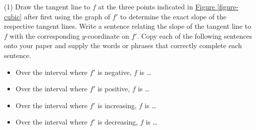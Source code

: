 \documentclass[12pt,]{book}
\theoremstyle{plain}
\theoremstyle{definition}
\numberwithin{equation}{section}
\newcounter{figstack}
\newcounter{figindex}
\newlength\fight
\newcommand\pushValignCaptionBottom[5][b]{%
\stepcounter{figstack}%
\expandafter\def\csname %
figalign\romannumeral\value{figstack}\endcsname{#1}%
\expandafter\def\csname %
figtype\romannumeral\value{figstack}\endcsname{#2}%
\expandafter\def\csname %
figwd\romannumeral\value{figstack}\endcsname{#3}%
\expandafter\def\csname %
figcontent\romannumeral\value{figstack}\endcsname{#4}%
\expandafter\def\csname %
figcap\romannumeral\value{figstack}\endcsname{#5}%
\setbox0=\hbox{%
\begin{#2}{#3}#4\end{#2}}%
\ifdim\dimexpr\ht0+\dp0\relax>\fight\global\setlength{\fight}{%
\dimexpr\ht0+\dp0\relax}\fi%
}
\newcommand\popValignCaptionBottom{%
\setcounter{figindex}{0}%
\hfill%
\whiledo{\value{figindex}<\value{figstack}}{%
\stepcounter{figindex}%
\def\tmp{\csname figwd\romannumeral\value{figindex}\endcsname}%
\begin{\csname figtype\romannumeral\value{figindex}\endcsname}[t]{\tmp}%
\centering%
\stackinset{c}{}%
{\csname figalign\romannumeral\value{figindex}\endcsname}{}%
{\csname figcontent\romannumeral\value{figindex}\endcsname}%
{\rule{0pt}{\fight}}\par%
\csname figcap\romannumeral\value{figindex}\endcsname%
\end{\csname figtype\romannumeral\value{figindex}\endcsname}%
\hfill%
}%
\setcounter{figstack}{0}%
\setlength{\fight}{0pt}%
\hfill%
}
\newcommand{\fe}[2]{#1\mathopen{}\left(#2\right)\mathclose{}}
\newcommand{\fd}[1]{#1'}
\begin{document}
\par
\begin{exercisegroup}(1)
\exercise[7.]\hypertarget{exercise-235}{\null}Draw the tangent line to \(f\) at the three points indicated in \hyperref[figure-cubic]{Figure \ref{figure-cubic}} after first using the graph of \(\fd{f}\) to determine the exact slope of the respective tangent lines.%
\exercise[8.]\hypertarget{exercise-236}{\null}Write a sentence relating the slope of the tangent line to \(f\) with the corresponding \(y\)-coordinate on \(\fd{f}\).%
\exercise[9.]\hypertarget{exercise-237}{\null}Copy each of the following sentences onto your paper and supply the words or phrases that correctly complete each sentence.%
\begin{itemize}[label=\textbullet]
\item{}Over the interval where \(\fd{f}\) is negative, \(f\) is \dots{}%
\item{}Over the interval where \(\fd{f}\) is positive, \(f\) is \dots{}%
\item{}Over the interval where \(\fd{f}\) is increasing, \(f\) is \dots{}%
\item{}Over the interval where \(\fd{f}\) is decreasing, \(f\) is \dots{}%
\end{itemize}
\end{exercisegroup}
\end{document}
